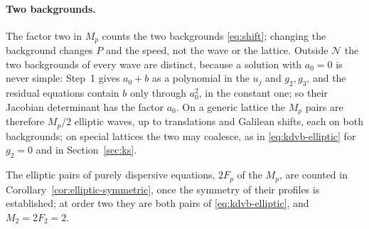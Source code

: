\paragraph{Two backgrounds.}
The factor two in \(M_p\) counts the two backgrounds \eqref{eq:shift};
changing the background changes \(P\) and the speed, not the wave or the
lattice. Outside \(\mathcal N\) the two backgrounds of every wave are
distinct, because a solution with \(a_0=0\) is never simple: Step~1
gives \(a_0+b\) as a polynomial in the \(u_j\) and \(g_2,g_3\), and the
residual equations contain \(b\) only through \(a_0^2\), in the constant
one; so their Jacobian determinant has the factor \(a_0\). On a generic
lattice the \(M_p\) pairs are therefore \(M_p/2\) elliptic waves, up to
translations and Galilean shifts, each on both backgrounds; on special
lattices the two may coalesce, as in \eqref{eq:kdvb-elliptic} for
\(g_2=0\) and in Section~\ref{sec:ks}.

The elliptic pairs of purely dispersive equations, \(2F_p\) of the
\(M_p\), are counted in Corollary~\ref{cor:elliptic-symmetric}, once the
symmetry of their profiles is established; at order two they are both
pairs of \eqref{eq:kdvb-elliptic}, and \(M_2=2F_2=2\).
